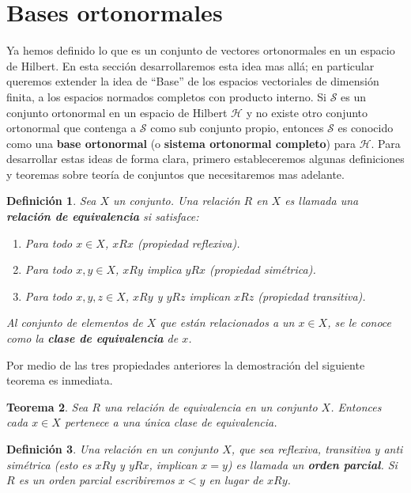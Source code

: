 \documentclass[12pt]{book}
\numberwithin{equation}{chapter}
\newtheorem{theorem}{Teorema}[chapter]
\newtheorem{definition}[theorem]{Definici\'on}
\def\S{\mathcal{S}}
\def\H{\mathcal{H}}
\begin{document}
\section{Bases ortonormales}
Ya hemos definido lo que es un conjunto de vectores ortonormales en un espacio de Hilbert. En esta secci\'on desarrollaremos esta idea mas all\'a; en particular queremos extender la idea de ``Base'' de los espacios vectoriales de dimensi\'on finita, a los espacios normados completos con producto interno. Si $\S$ es un conjunto ortonormal en un espacio de Hilbert $\H$ y no existe otro conjunto ortonormal que contenga a $\S$ como sub conjunto propio, entonces $\S$ es conocido como una {\bf base ortonormal} (o {\bf sistema ortonormal completo}) para $\H$. Para desarrollar estas ideas de forma clara, primero estableceremos algunas definiciones y teoremas sobre teor\'ia de conjuntos que necesitaremos mas adelante. 

\vspace{5 mm}

\begin{definition}
Sea $X$ un conjunto. Una relaci\'on $R$ en $X$ es llamada una {\bf relaci\'on de equivalencia} si satisface:
\begin{enumerate}
\item Para todo $x\in X$, $xRx$ (propiedad reflexiva).
\item Para todo $x,y \in X$, $xRy$ implica $yRx$ (propiedad sim\'etrica).
\item Para todo $x,y,z \in X$, $xRy$ y $yRz$ implican $xRz$ (propiedad transitiva).
\end{enumerate}
Al conjunto de elementos de $X$ que est\'an relacionados a un $x \in X$, se le conoce como la {\bf clase de equivalencia} de $x$.
\end{definition}

Por medio de las tres propiedades anteriores la demostraci\'on del siguiente teorema es inmediata.

\begin{theorem}
Sea $R$ una relaci\'on de equivalencia en un conjunto $X$. Entonces cada $x \in X$ pertenece a una \'unica clase de equivalencia.  
\end{theorem}

\begin{definition}
Una relaci\'on en un conjunto $X$, que sea reflexiva, transitiva y anti sim\'etrica (esto es $xRy$ y $yRx$, implican $x=y$) es llamada un {\bf orden parcial}.
Si $R$ es un orden parcial escribiremos $x < y$ en lugar de $xRy$.
\end{definition}
\end{document}
